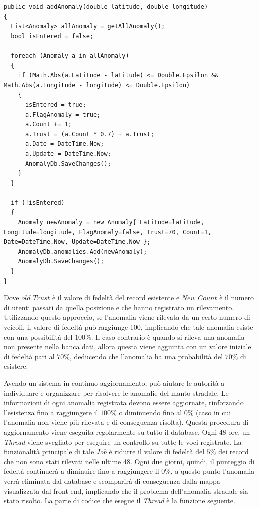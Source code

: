 \documentclass[a4paper, 11pt]{article} %
\begin{document}
\begin{lstlisting}
public void addAnomaly(double latitude, double longitude)
{
  List<Anomaly> allAnomaly = getAllAnomaly();
  bool isEntered = false;

  foreach (Anomaly a in allAnomaly)
  {
    if (Math.Abs(a.Latitude - latitude) <= Double.Epsilon && Math.Abs(a.Longitude - longitude) <= Double.Epsilon)
    {
      isEntered = true;
      a.FlagAnomaly = true;
      a.Count += 1;
      a.Trust = (a.Count * 0.7) + a.Trust;
      a.Date = DateTime.Now;
      a.Update = DateTime.Now;
      AnomalyDb.SaveChanges();
    }
  }

  if (!isEntered)
  {
    Anomaly newAnomaly = new Anomaly{ Latitude=latitude, Longitude=longitude, FlagAnomaly=false, Trust=70, Count=1,  Date=DateTime.Now, Update=DateTime.Now };
    AnomalyDb.anomalies.Add(newAnomaly);
    AnomalyDb.SaveChanges();
  }
}
\end{lstlisting}
Dove $old\_Trust$ è il valore di fedeltà del record esistente e $New\_Count$ è il numero di utenti passati da quella posizione e che hanno registrato un rilevamento. Utilizzando questo approccio, se l'anomalia viene rilevata da un certo numero di veicoli, il valore di fedeltà può raggiunge 100, implicando che tale anomalia esiste con una possibilità del $100\%$.
Il caso contrario è quando si rileva una anomalia non presente nella banca dati, allora questa viene aggiunta con un valore iniziale di fedeltà pari al $70\%$, deducendo che l'anomalia ha una probabilità del $70\%$ di esistere.

Avendo un sistema in continuo aggiornamento, può aiutare le autorità a individuare e organizzare per risolvere le anomalie del manto stradale. Le informazioni di ogni anomalia registrata devono essere aggiornate, rinforzando l'esistenza fino a raggiungere il $100\%$ o diminuendo fino al $0\%$ (caso in cui l'anomalia non viene più rilevata e di conseguenza risolta). Questa procedura di aggiornamento viene eseguita regolarmente su tutto il database. Ogni 48 ore, un \textit{Thread} viene svegliato per eseguire un controllo su tutte le voci registrate. La funzionalità principale di tale \textit{Job} è ridurre il valore di fedeltà del $5\%$ dei record che non sono stati rilevati nelle ultime 48. Ogni due giorni, quindi, il punteggio di fedeltà continuerà a diminuire fino a raggiungere il $0\%$, a questo punto l'anomalia verrà eliminata dal database e scomparirà di conseguenza dalla mappa visualizzata dal front-end, implicando che il problema dell'anomalia stradale sia stato risolto. La parte di codice che esegue il \textit{Thread} è la funzione seguente.
\end{document}
